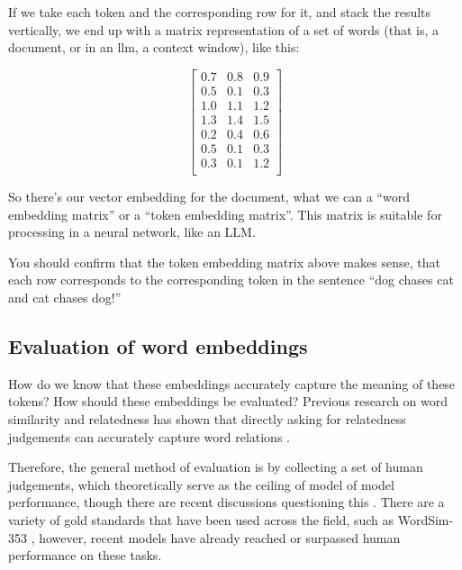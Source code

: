 If we take each token and the corresponding row for it, and stack the results vertically, we end up with a matrix representation of a set of words (that is, a document, or in an llm, a context window), like this: 

\[
\begin{bmatrix}
    0.7 & 0.8 & 0.9 \\
    0.5 & 0.1 & 0.3 \\
    1.0 & 1.1 & 1.2 \\
    1.3 & 1.4 & 1.5 \\
    0.2 & 0.4 & 0.6 \\
    0.5 & 0.1 & 0.3 \\
    0.3 & 0.1 & 1.2 \\
\end{bmatrix}
\]

So there's our vector embedding for the document,  what we can a ``word embedding matrix'' or a ``token embedding matrix''. This matrix is suitable for processing in a neural network, like an LLM. 

You should confirm that the token embedding matrix above makes sense, that each row corresponds to the corresponding token in the sentence ``dog chases cat and cat chases dog!''

\subsection{Evaluation of word embeddings}


How do we know that these embeddings accurately capture the meaning of these tokens? How should these embeddings be evaluated? Previous research on word similarity and relatedness has shown that directly asking for relatedness judgements can accurately capture word relations \cite{finkelstein2001placing}.

Therefore, the general method of evaluation is by collecting a set of human judgements, which theoretically serve as the ceiling of model of model performance, though there are recent discussions questioning this \cite{richie2022inter}.
There are a variety of gold standards that have been used across the field, such as WordSim-353 \cite{finkelstein2001placing, agirre2009study}, however, recent models have already reached or surpassed human performance on these tasks.

